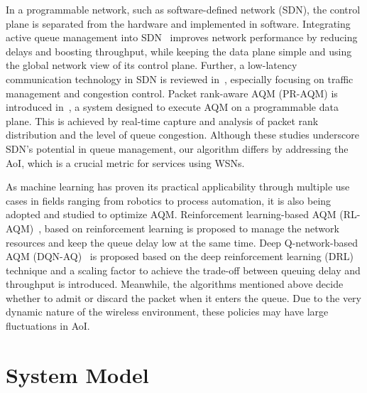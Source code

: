 \documentclass[journal]{IEEEtran}
\begin{document}
In a programmable network, such as software-defined network (SDN), the control plane is separated from the hardware and implemented in software. Integrating active queue management into SDN~\cite{palma2014queuepusher,gu2015controlled} improves network performance by reducing delays and boosting throughput, while keeping the data plane simple and using the global network view of its control plane. Further, a low-latency communication technology in SDN is reviewed in~\cite{yan2021survey}, especially focusing on traffic management and congestion control. Packet rank-aware AQM (PR-AQM) is introduced in~\cite{li2023packet}, a system designed to execute AQM on a programmable data plane. This is achieved by real-time capture and analysis of packet rank distribution and the level of queue congestion. Although these studies underscore SDN's potential in queue management, our algorithm differs by addressing the AoI, which is a crucial metric for services using WSNs.

As machine learning has proven its practical applicability through multiple use cases in fields ranging from robotics to process automation, it is also being adopted and studied to optimize AQM. Reinforcement learning-based AQM (RL-AQM)~\cite{Alwahab2021}, based on reinforcement learning is proposed to manage the network resources and keep the queue delay low at the same time. Deep Q-network-based AQM (DQN-AQ)~\cite{kim2021deep} is proposed based on the deep reinforcement learning (DRL) technique and a scaling factor to achieve the trade-off between queuing delay and throughput is introduced. Meanwhile, the algorithms mentioned above decide whether to admit or discard the packet when it enters the queue. Due to the very dynamic nature of the wireless environment, these policies may have large fluctuations in AoI.

\section{System Model}
\label{sec:systemmodel}
\end{document}
